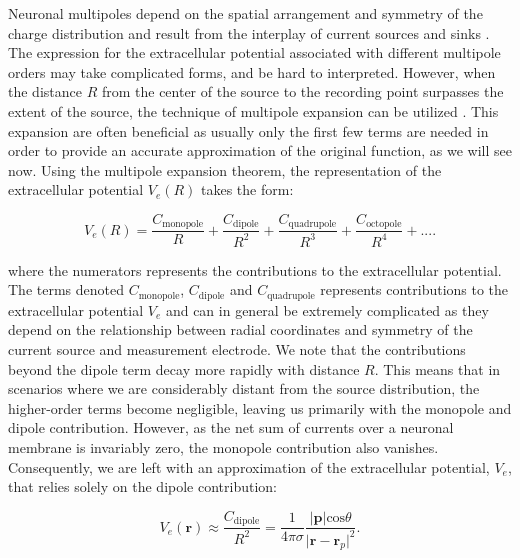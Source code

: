 \documentclass[a4paper, UKenglish, 11pt]{uiomaster}
\begin{document}
Neuronal multipoles depend on the spatial arrangement and symmetry of the charge distribution and result from the interplay of current sources and sinks \cite{wiki:multipoles}. The expression for the extracellular potential associated with different multipole orders may take complicated forms, and be hard to interpreted. However, when the distance $R$ from the center of the source to the recording point surpasses the extent of the source, the technique of multipole expansion can be utilized \cite{jackson1999classical}. This expansion are often beneficial as usually only the first few terms are needed in order to provide an accurate approximation of the original function, as we will see now. Using the multipole expansion theorem, the representation of the extracellular potential $V_e(R)$ takes the form:

\begin{equation}
  V_e(R) = \frac{C_{\text{monopole}}}{R} + \frac{C_{\text{dipole}}}{R^2} + \frac{C_{\text{quadrupole}}}{R^3} + \frac{C_{\text{octopole}}}{R^4} + ... .
\label{eq:extracellular_potential}
\end{equation}

where the numerators represents the contributions to the extracellular potential. The terms denoted $C_\text{monopole}$, $C_\text{dipole}$ and $C_\text{quadrupole}$ represents contributions to the extracellular potential $V_e$ and can in general be extremely complicated as they depend on the relationship between radial coordinates and symmetry of the current source and measurement electrode. We note that the contributions beyond the dipole term decay more rapidly with distance $R$. This means that in scenarios where we are considerably distant from the source distribution, the higher-order terms become negligible, leaving us primarily with the monopole and dipole contribution. However, as the net sum of currents over a neuronal membrane is invariably zero, the monopole contribution also vanishes. Consequently, we are left with an approximation of the extracellular potential, $V_e$, that relies solely on the dipole contribution:

\begin{equation}
V_e(\textbf{r}) \approx \frac{C_{\text{dipole}}}{R^2} = \frac{1}{4\pi\sigma}\frac{|\textbf{p}| \text{cos} \theta}{\lvert\textbf{r}-\textbf{r}_p\rvert^2}.
\label{eq:extracellular_potential_approximation}
\end{equation}
\end{document}
